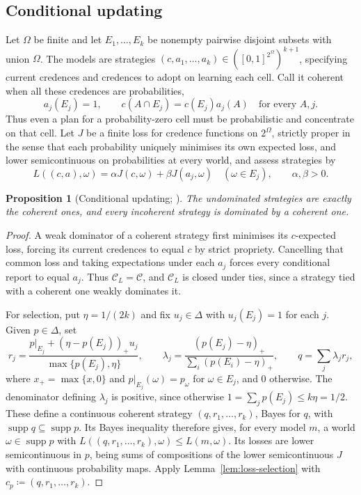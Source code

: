 \documentclass[11pt]{article}
\newtheorem{proposition}[theorem]{Proposition}
\theoremstyle{definition}
\theoremstyle{remark}
\newcommand{\C}{\mathcal C}
\newcommand{\supp}{\operatorname{supp}}
\begin{document}
\subsection{Conditional updating}
Let $\Omega$ be finite and let $E_1,\ldots,E_k$ be nonempty pairwise disjoint subsets with union $\Omega$. The models are strategies $(c,a_1,\ldots,a_k)\in([0,1]^{2^\Omega})^{k+1}$, specifying current credences and credences to adopt on learning each cell. Call it coherent when all these credences are probabilities,
\[
a_j(E_j)=1,\qquad c(A\cap E_j)=c(E_j)a_j(A)\quad\text{for every }A,j.
\]
Thus even a plan for a probability-zero cell must be probabilistic and concentrate on that cell. Let $J$ be a finite loss for credence functions on $2^\Omega$, strictly proper in the sense that each probability uniquely minimises its own expected loss, and lower semicontinuous on probabilities at every world, and assess strategies by
\[
L((c,a),\omega)=\alpha J(c,\omega)+\beta J(a_j,\omega)
\quad(\omega\in E_j),\qquad \alpha,\beta>0.
\]
\begin{proposition}[Conditional updating; {\cite{Briggs2020,Nielsen2021}}]\label{prop:short-updating}
The undominated strategies are exactly the coherent ones, and every incoherent strategy is dominated by a coherent one.
\end{proposition}
\begin{proof}
A weak dominator of a coherent strategy first minimises its $c$-expected loss, forcing its current credences to equal $c$ by strict propriety. Cancelling that common loss and taking expectations under each $a_j$ forces every conditional report to equal $a_j$. {Thus $\C_L=\C$, and $\C_L$ is closed under ties, since a strategy tied with a coherent one weakly dominates it.}

For selection, put $\eta=1/(2k)$ and fix $u_j\in\Delta$ with $u_j(E_j)=1$ for each $j$. Given $p\in\Delta$, set
\[
r_j=\frac{p|_{E_j}+(\eta-p(E_j))_+u_j}{\max\{p(E_j),\eta\}},\qquad
\lambda_j=\frac{(p(E_j)-\eta)_+}{\sum_i(p(E_i)-\eta)_+},\qquad
q=\sum_j\lambda_jr_j,
\]
where $x_+=\max\{x,0\}$ and $p|_{E_j}(\omega)=p_\omega$ for $\omega\in E_j$, and $0$ otherwise. The denominator defining $\lambda_j$ is positive, since otherwise $1=\sum_jp(E_j)\le k\eta=1/2$. These define a continuous coherent strategy $(q,r_1,\ldots,r_k)$, Bayes for $q$, with $\supp q\subseteq\supp p$. Its Bayes inequality therefore gives, for every model $m$, a world $\omega\in\supp p$ with $L((q,r_1,\ldots,r_k),\omega)\le L(m,\omega)$. Its losses are lower semicontinuous in $p$, being sums of compositions of the lower semicontinuous $J$ with continuous probability maps. {Apply Lemma~\ref{lem:loss-selection} with $c_p\coloneqq(q,r_1,\ldots,r_k)$.}
\end{proof}
\end{document}
